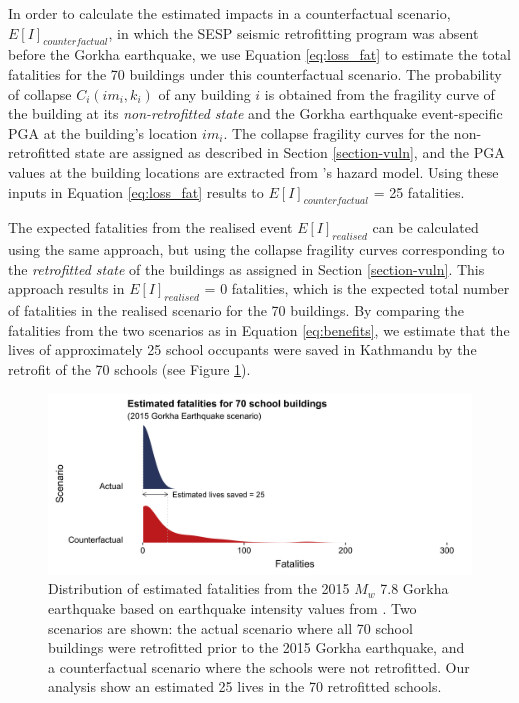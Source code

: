 In order to calculate the estimated impacts in a counterfactual scenario, $E[I]_{counterfactual}$, in which the SESP seismic retrofitting program was absent before the Gorkha earthquake, we use Equation \ref{eq:loss_fat} to estimate the total fatalities for the 70 buildings under this counterfactual scenario. The probability of collapse $C_{i}(im_{i}, k_{i})$ of any building $i$ is obtained from the fragility curve of the building at its \textit{non-retrofitted state} and the Gorkha earthquake event-specific PGA at the building's location $im_{i}$. The collapse fragility curves for the non-retrofitted state are assigned as described in Section \ref{section-vuln}, and the PGA values at the building locations are extracted from \cite{chen20192015}'s hazard model. Using these inputs in Equation \ref{eq:loss_fat} results to $E[I]_{counterfactual}$ = 25 fatalities.

The expected fatalities from the realised event $E[I]_{realised}$ can be calculated using the same approach, but using the collapse fragility curves corresponding to the \textit{retrofitted state} of the buildings as assigned in Section \ref{section-vuln}. This approach results in $E[I]_{realised}$ = 0 fatalities, which is the expected total number of fatalities in the realised scenario for the 70 buildings. By comparing the fatalities from the two scenarios as in Equation \ref{eq:benefits}, we estimate that the lives of approximately 25 school occupants were saved in Kathmandu by the retrofit of the 70 schools (see Figure \ref{fig:results_case1}).

\begin{figure}[h!] 
\begin{center} 
    \includegraphics[width=\linewidth]{Figures/results_case1-v2.png}
	\caption{Distribution of estimated fatalities from the 2015 $M_{w}$ 7.8 Gorkha earthquake based on earthquake intensity values from \cite{chen20192015}. Two scenarios are shown: the actual scenario where all 70 school buildings were retrofitted prior to the 2015 Gorkha earthquake, and a counterfactual scenario where the schools were not retrofitted. Our analysis show an estimated 25 lives in the 70 retrofitted schools.}
\label{fig:results_case1}
\end{center}
\end{figure}

